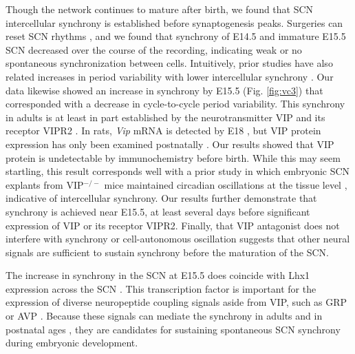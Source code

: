 Though the network continues to mature after birth, we found that SCN intercellular synchrony is established before synaptogenesis peaks.
Surgeries can reset SCN rhythms \cite{Landgraf2015}, and we found that synchrony of E14.5 and immature E15.5 SCN decreased over the course of the recording, indicating weak or no spontaneous synchronization between cells.
Intuitively, prior studies have also related increases in period variability with lower intercellular synchrony \cite{Honma2004, Webb2009}.
Our data likewise showed an increase in synchrony by E15.5 (Fig.
\ref{fig:vc3}) that corresponded with a decrease in cycle-to-cycle period variability.
This synchrony in adults is at least in part established by the neurotransmitter VIP and its receptor VIPR2 \cite{Harmar2002, Colwell2003, Aton2005, Maywood2006, Ciarleglio2009}.
In rats, \textit{Vip} mRNA is detected by E18 \cite{Ban1997, Houdek2014}, but VIP protein expression has only been examined postnatally \cite{Herzog2000}.
Our results showed that VIP protein is undetectable by immunochemistry before birth.
While this may seem startling, this result corresponds well with a prior study in which embryonic SCN explants from VIP$^{-/-}$ mice maintained circadian oscillations at the tissue level \cite{Wreschnig2014}, indicative of intercellular synchrony.
Our results further demonstrate that synchrony is achieved near E15.5, at least several days before significant expression of VIP or its receptor VIPR2.
Finally, that VIP antagonist does not interfere with synchrony or cell-autonomous oscillation suggests that other neural signals are sufficient to sustain synchrony before the maturation of the SCN. 

The increase in synchrony in the SCN at E15.5 does coincide with Lhx1 expression across the SCN \cite{VanDunk2011}.
This transcription factor is important for the expression of diverse neuropeptide coupling signals aside from VIP, such as GRP or AVP \cite{Bedont2014}.
Because these signals can mediate the synchrony in adults \cite{Brown2005, Maywood2011} and in postnatal ages \cite{Ono2016}, they are candidates for sustaining spontaneous SCN synchrony during embryonic development.

